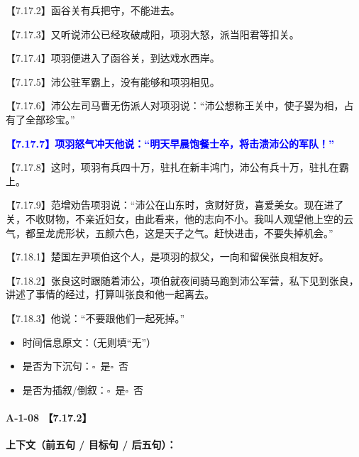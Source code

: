 \documentclass[fontset=none,11pt,a4paper]{ctexart}
\newcommand{\answerline}[1]{\underline{\hspace{#1}}}
\newcommand{\choicebox}[1]{$\square$~#1}
\begin{document}
\noindent 【7.17.2】函谷关有兵把守，不能进去。\par
\noindent 【7.17.3】又听说沛公已经攻破咸阳，项羽大怒，派当阳君等扣关。\par
\noindent 【7.17.4】项羽便进入了函谷关，到达戏水西岸。\par
\noindent 【7.17.5】沛公驻军霸上，没有能够和项羽相见。\par
\noindent 【7.17.6】沛公左司马曹无伤派人对项羽说：“沛公想称王关中，使子婴为相，占有了全部珍宝。”\par
\noindent \textcolor{blue}{\textbf{【7.17.7】项羽怒气冲天他说：“明天早晨饱餐士卒，将击溃沛公的军队！”}}\par
\noindent 【7.17.8】这时，项羽有兵四十万，驻扎在新丰鸿门，沛公有兵十万，驻扎在霸上。\par
\noindent 【7.17.9】范增劝告项羽说：“沛公在山东时，贪财好货，喜爱美女。现在进了关，不收财物，不亲近妇女，由此看来，他的志向不小。我叫人观望他上空的云气，都呈龙虎形状，五颜六色，这是天子之气。赶快进击，不要失掉机会。”\par
\noindent 【7.18.1】楚国左尹项伯这个人，是项羽的叔父，一向和留侯张良相友好。\par
\noindent 【7.18.2】张良这时跟随着沛公，项伯就夜间骑马跑到沛公军营，私下见到张良，讲述了事情的经过，打算叫张良和他一起离去。\par
\noindent 【7.18.3】他说：“不要跟他们一起死掉。”\par

\begin{itemize}
  \item 时间信息原文：\answerline{7.5cm}（无则填“无”）
  \item 是否为下沉句：\choicebox{是}\quad \choicebox{否}
  \item 是否为插叙/倒叙：\choicebox{是}\quad \choicebox{否}
\end{itemize}

\paragraph{A-1-08 \quad 【7.17.2】}
\textbf{上下文（前五句 / 目标句 / 后五句）：}
\end{document}
